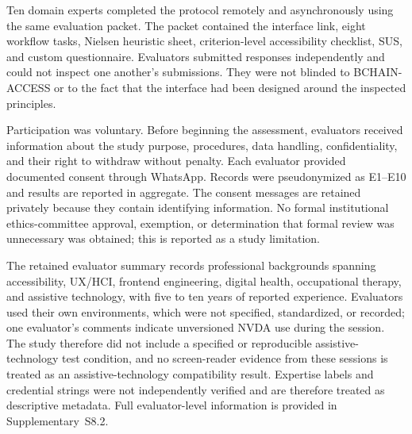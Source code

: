 \documentclass[journal]{IEEEtran}
\begin{document}
Ten domain experts completed the protocol remotely and asynchronously using the same evaluation packet. The packet contained the interface link, eight workflow tasks, Nielsen heuristic sheet, criterion-level accessibility checklist, SUS, and custom questionnaire. Evaluators submitted responses independently and could not inspect one another's submissions. They were not blinded to BCHAIN-ACCESS or to the fact that the interface had been designed around the inspected principles.

Participation was voluntary. Before beginning the assessment, evaluators received information about the study purpose, procedures, data handling, confidentiality, and their right to withdraw without penalty. Each evaluator provided documented consent through WhatsApp. Records were pseudonymized as E1--E10 and results are reported in aggregate. The consent messages are retained privately because they contain identifying information. No formal institutional ethics-committee approval, exemption, or determination that formal review was unnecessary was obtained; this is reported as a study limitation.

The retained evaluator summary records professional backgrounds spanning accessibility, UX/HCI, frontend engineering, digital health, occupational therapy, and assistive technology, with five to ten years of reported experience. Evaluators used their own environments, which were not specified, standardized, or recorded; one evaluator's comments indicate unversioned NVDA use during the session. The study therefore did not include a specified or reproducible assistive-technology test condition, and no screen-reader evidence from these sessions is treated as an assistive-technology compatibility result. Expertise labels and credential strings were not independently verified and are therefore treated as descriptive metadata. Full evaluator-level information is provided in Supplementary~S8.2.
\end{document}
